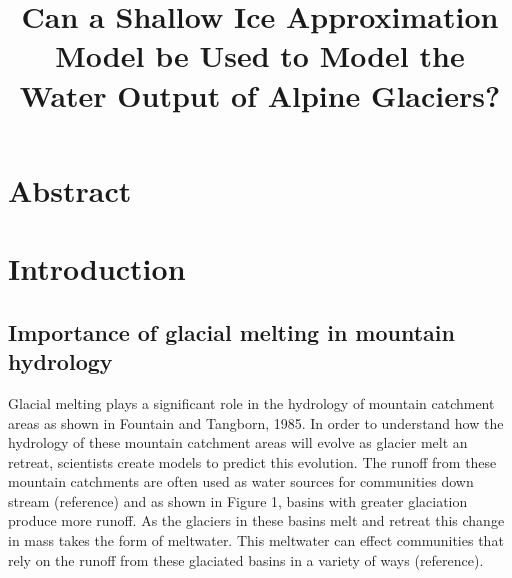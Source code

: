 \documentclass{article}
\title{Can a Shallow Ice Approximation Model be Used to Model the Water Output of Alpine Glaciers?}
\author{}
\date{}
\begin{document}
\maketitle

\section*{Abstract}

\section{Introduction}
\subsection{Importance of glacial melting in mountain hydrology}
Glacial melting plays a significant role in the hydrology of mountain catchment areas as shown in Fountain and Tangborn, 1985. In order to 
understand how the hydrology of these mountain catchment areas will evolve as glacier melt an retreat, scientists create models to predict 
this evolution. The runoff from these mountain catchments are often used as water sources for communities down stream (reference) and as shown in 
Figure 1, basins with greater glaciation produce more runoff. As the glaciers in these basins melt and retreat this change in mass takes the 
form of meltwater. This meltwater can effect communities that rely on the runoff from these glaciated basins in a variety of ways (reference).
\end{document}
